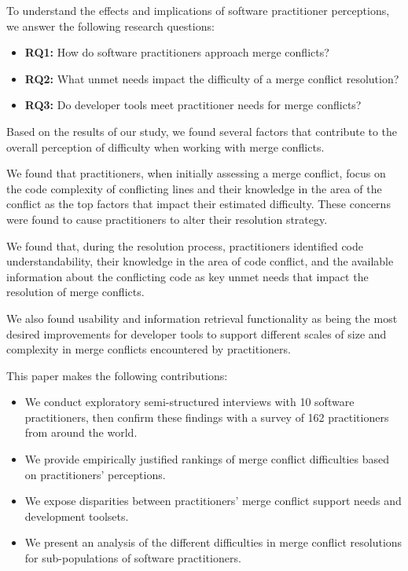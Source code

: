 To understand the effects and implications of software practitioner perceptions, we answer the following research questions:

\begin{itemize}
\item \textbf{RQ1:} How do software practitioners approach merge conflicts?
\item \textbf{RQ2:} What unmet needs impact the difficulty of a merge conflict resolution?
\item \textbf{RQ3:} Do developer tools meet practitioner needs for merge conflicts?
\end{itemize}

Based on the results of our study, we found several factors that contribute to the overall perception of difficulty when working with merge conflicts.

We found that practitioners, when initially assessing a merge conflict, focus on the code complexity of conflicting lines and their knowledge in the area of the conflict as the top factors that impact their estimated difficulty.
These concerns were found to cause practitioners to alter their resolution strategy.

We found that, during the resolution process, practitioners identified code understandability, their knowledge in the area of code conflict, and the available information about the conflicting code as key unmet needs that impact the resolution of merge conflicts.

We also found usability and information retrieval functionality as being the most desired improvements for developer tools to support different scales of size and complexity in merge conflicts encountered by practitioners.

This paper makes the following contributions:
\begin{itemize}
\item We conduct exploratory semi-structured interviews with 10 software practitioners, then confirm these findings with a survey of 162 practitioners from around the world.
\item We provide empirically justified rankings of merge conflict difficulties based on practitioners' perceptions.
\item We expose disparities between practitioners' merge conflict support needs and development toolsets.
\item We present an analysis of the different difficulties in merge conflict resolutions for sub-populations of software practitioners.
\end{itemize}